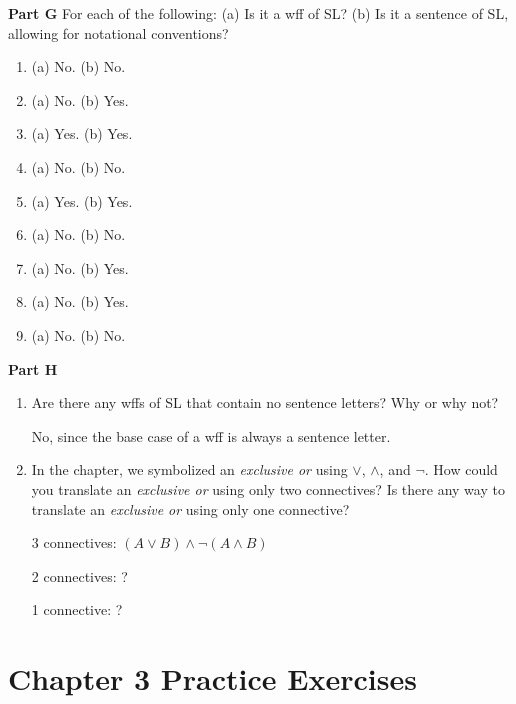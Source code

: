 \documentclass[12pt, letterpaper, twoside]{article}
\begin{document}
\noindent \textbf{Part G} For each of the following: (a) Is it a wff of SL? (b) Is it a sentence of SL, allowing for notational conventions?
\begin{enumerate}
	\item (a) No. (b) No.
	\item (a) No. (b) Yes.
	\item (a) Yes. (b) Yes.
	\item (a) No. (b) No.
	\item (a) Yes. (b) Yes.
	\item (a) No. (b) No.
	\item (a) No. (b) Yes.
	\item (a) No. (b) Yes.
	\item (a) No. (b) No.
\end{enumerate}

\noindent \textbf{Part H}
\begin{enumerate}
	\item Are there any wffs of SL that contain no sentence letters? Why or why not?

	No, since the base case of a wff is always a sentence letter.

	\item In the chapter, we symbolized an \emph{exclusive or} using $\vee$, $\wedge$, and $\neg$. How could you translate an \emph{exclusive or} using only two connectives? Is there any way to translate an \emph{exclusive or} using only one connective?

	3 connectives: $(A \vee B) \wedge \neg (A \wedge B)$

	2 connectives: ?

	1 connective: ?
\end{enumerate}

\section{Chapter 3 Practice Exercises}
\end{document}
